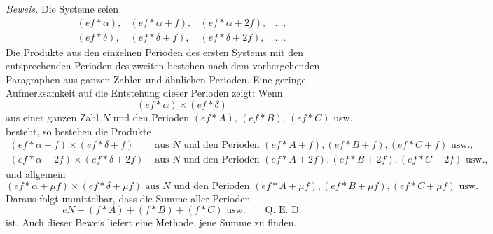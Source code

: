 \documentclass[12pt]{article}
\begin{document}
\textit{Beweis.} Die Systeme seien
\[
\begin{array}{cccc}
(ef*\alpha),&(ef*\alpha+f),&(ef*\alpha+2f),&\ldots,\\
(ef*\delta),&(ef*\delta+f),&(ef*\delta+2f),&\ldots.
\end{array}
\]
Die Produkte aus den einzelnen Perioden des ersten Systems mit den entsprechenden Perioden des zweiten bestehen nach dem vorhergehenden Paragraphen aus ganzen Zahlen und ähnlichen Perioden. Eine geringe Aufmerksamkeit auf die Entstehung dieser Perioden zeigt: Wenn
\[
(ef*\alpha)\times(ef*\delta)
\]
aus einer ganzen Zahl $N$ und den Perioden $(ef*A)$, $(ef*B)$, $(ef*C)$ usw. besteht, so bestehen die Produkte
\[
\begin{aligned}
(ef*\alpha+f)\times(ef*\delta+f)&\text{ aus }N\text{ und den Perioden }(ef*A+f),(ef*B+f),(ef*C+f)\text{ usw.},\\
(ef*\alpha+2f)\times(ef*\delta+2f)&\text{ aus }N\text{ und den Perioden }(ef*A+2f),(ef*B+2f),(ef*C+2f)\text{ usw.},
\end{aligned}
\]
und allgemein
\[
(ef*\alpha+\mu f)\times(ef*\delta+\mu f)\text{ aus }N\text{ und den Perioden }(ef*A+\mu f),(ef*B+\mu f),(ef*C+\mu f)\text{ usw.}
\]
Daraus folgt unmittelbar, dass die Summe aller Perioden
\[
eN+(f*A)+(f*B)+(f*C)\text{ usw.}\qquad\text{Q. E. D.}
\]
ist. Auch dieser Beweis liefert eine Methode, jene Summe zu finden.
\end{document}
